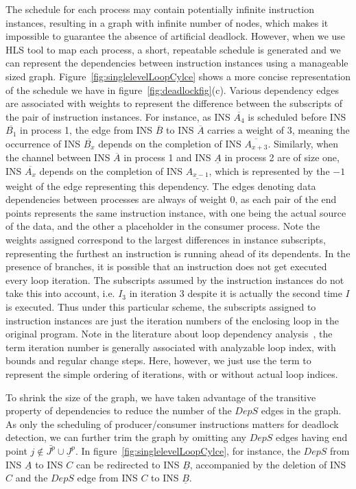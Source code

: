 The schedule for each process may contain potentially infinite instruction instances, resulting in a graph with infinite number of nodes,
which makes it impossible to guarantee the absence of artificial deadlock.
However, when we use HLS tool to map each process,
a short, repeatable schedule is generated and we can represent the
dependencies between instruction instances using a manageable
sized graph. 
Figure~\ref{fig:singlelevelLoopCylce} shows a more concise
representation of the schedule we have in figure~\ref{fig:deadlockfig}(c).
Various dependency edges are associated with weights to 
represent the difference between the subscripts of the pair of instruction
instances. For instance, as INS $\overline{A_4}$ is 
scheduled before INS $\overline{B_1}$ in process 1, the edge from INS $\overline{B}$ to INS $\overline{A}$ carries
a weight of 3, meaning the occurrence of INS $\overline{B_x}$ depends on the completion of INS $\overline{A_{x+3}}$. Similarly, when the channel between 
INS $\overline{A}$ in process 1 and INS $\underline{A}$ in process 2 are of size one, INS $\overline{A_x}$ depends on the completion of INS $\underline{A_{x-1}}$, 
which is represented by the $-1$ weight of the edge representing this
dependency. The edges denoting data dependencies between processes
are always of weight 0, as each pair of the end points represents the same instruction instance, with one being the actual source of the data, and the other a placeholder in the consumer process.
Note the weights assigned correspond to the largest differences
in instance subscripts, representing the furthest an instruction is running
ahead of its dependents. In the presence of branches, it is possible that
an instruction does not get executed every loop iteration. The subscripts
assumed by the instruction instances do not take this into account, i.e. $I_3$
in iteration 3 despite it is actually the second time $I$ is executed. Thus under
this particular scheme, the subscripts assigned to instruction instances
are just the iteration numbers of the enclosing loop in the original program.
Note in the literature about loop dependency analysis~\cite{Kennedy:2001:OCM:502981}, the term iteration number is generally associated with analyzable loop index, with
bounds and regular change steps. Here, however, we just use the term to represent the simple ordering of iterations, with or without actual loop indices.

To shrink the size of the graph, we have taken advantage of the transitive property of dependencies to reduce the number of the $DepS$ edges in the graph.
As only the scheduling of producer/consumer instructions matters for
deadlock detection, we can further trim the graph by omitting any $DepS$ edges having end point $j \not\in \bar{J^p} \cup \underline{J}^p$. In figure~\ref{fig:singlelevelLoopCylce}, for instance, the $DepS$ from INS $\underline{A}$ to INS $C$ can be redirected to INS $\underline{B}$, accompanied by the deletion of INS $C$ and the $DepS$ edge from INS $C$ to INS $\underline{B}$.


